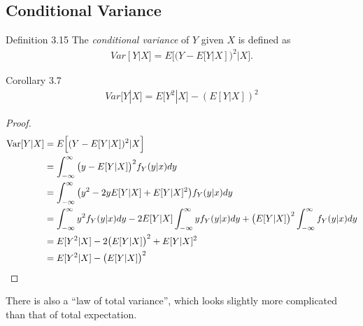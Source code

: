 \subsection{Conditional Variance}
\begin{boks}{Definition 3.15}
  The \textit{conditional variance} of $Y$ given $X$ is defined as
  \begin{align*}
    Var[Y|X] = E\Big[(Y - E[Y|X])^2|X\Big].
  \end{align*}
\end{boks}
%

\begin{boks}{Corollary 3.7}
  \begin{align*}
    Var[Y|X] = E\Big[Y^2|X\Big] - (E[Y|X])^2
  \end{align*}
\end{boks}

\begin{proof}
  \begin{align*}
    \operatorname{Var}[Y|X] &=
    E\Big[ (Y - E[Y|X])^2 | X \Big] \\ &=
    \int_{-\infty}^\infty \big(y - E[Y|X]\big)^2 f_Y(y|x) dy \\ &=
    \int_{-\infty}^\infty \big(y^2 - 2yE[Y|X] + E[Y|X]^2\big) f_Y(y|x) dy \\ &=
    \int_{-\infty}^\infty y^2 f_Y(y|x) dy -
    2E[Y|X]\int_{-\infty}^\infty y f_Y(y|x) dy +
    \big(E[Y|X]\big)^2 \int_{-\infty}^\infty f_Y(y|x) dy \\ &=
    E[Y^2|X] - 2\big(E[Y|X]\big)^2 + E[Y|X]^2 \\ &=
    E[Y^2|X] - \big(E[Y|X]\big)^2
  \end{align*}
\end{proof}

There is also a ``law of total variance'', which looks slightly more complicated than that of total expectation.

